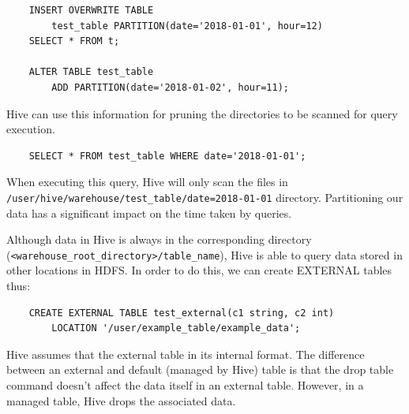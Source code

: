 \begin{lstlisting}
	INSERT OVERWRITE TABLE
		test_table PARTITION(date='2018-01-01', hour=12)
	SELECT * FROM t;
	
	ALTER TABLE test_table
		ADD PARTITION(date='2018-01-02', hour=11);
\end{lstlisting}

Hive can use this information for pruning the directories to be scanned for query execution. 
\begin{lstlisting}
	SELECT * FROM test_table WHERE date='2018-01-01';
\end{lstlisting}
When executing this query, Hive will only scan the files in \texttt{/user/hive/warehouse/test\_table/date=2018-01-01} directory. Partitioning our data has a significant impact on the time taken by queries.

Although data in Hive is always in the corresponding directory (\texttt{<warehouse\_root\_directory>/table\_name}), Hive is able to query data stored in other locations in HDFS. In order to do this, we can create EXTERNAL tables thus:
\begin{lstlisting}
	CREATE EXTERNAL TABLE test_external(c1 string, c2 int)
		LOCATION '/user/example_table/example_data';
\end{lstlisting}

Hive assumes that the external table in its internal format. The difference between an external and default (managed by Hive) table is that the drop table command doesn't affect the data itself in an external table. However, in a managed table, Hive drops the associated data.

